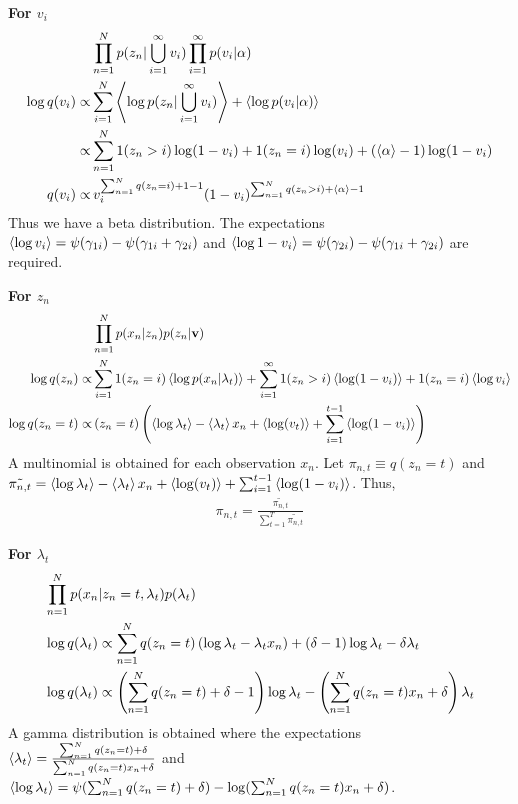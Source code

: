 \documentclass{article}
\begin{document}
\textbf{For $v_i $}
\begin{align}
\nonumber& \prod_{n=1}^{N}p(z_n|\bigcup_{i=1}^{\infty}v_i)\prod_{i=1}^{\infty}p(v_i|\alpha)\\
\nonumber \log q(v_i)\propto & \sum_{i=1}^{N} \left\langle\log p(z_n|\bigcup_{i=1}^{\infty}v_i)\right\rangle+\left\langle\log p(v_i|\alpha)\right\rangle\\
\nonumber \propto&\sum_{n=1}^{N}1(z_n>i)\log(1-v_i)+1(z_n=i)\log(v_i)+(\left\langle\alpha\right\rangle-1)\log (1-v_i)\\
q(v_i) \propto & \,v_i^{\sum_{n=1}^{N} q(z_n=i)+1-1}(1-v_i)^{\sum_{n=1}^{N} q(z_n>i)+\left\langle\alpha\right\rangle-1}
\end{align}
Thus we have a beta distribution. The expectations $\left\langle\log v_i\right\rangle=\psi(\gamma_{1i})-\psi(\gamma_{1i}+\gamma_{2i})$ and $\left\langle\log 1-v_i\right\rangle=\psi(\gamma_{2i})-\psi(\gamma_{1i}+\gamma_{2i})$ are required.

\textbf{For $z_n$}
\begin{align}
\nonumber&\prod_{n=1}^{N} p(x_n|z_n)p(z_n|\mathbf{v})\\
\nonumber\log q(z_n)\propto &\sum_{i=1}^{N} 1(z_n=i)\left\langle\log p(x_n|\lambda_t)\right\rangle+\sum_{i=1}^{\infty} 1(z_n>i)\left\langle\log(1-v_i)\right\rangle+1(z_n=i)\left\langle\log v_i\right\rangle\\
\log q(z_n=t)\propto &\left(z_n=t\right)\left(\left\langle\log \lambda_t\right\rangle-\left\langle\lambda_t\right\rangle x_n+\left\langle\log(v_t)\right\rangle+\sum_{i=1}^{t-1}\left\langle\log(1-v_i)\right\rangle\right)
\end{align}
A multinomial is obtained for each observation $x_n$. Let $\pi_{n,t}\equiv q(z_n=t)$ and $\tilde{\pi_{n,t}}=\left\langle\log \lambda_t\right\rangle-\left\langle\lambda_t\right\rangle x_n+\left\langle\log(v_t)\right\rangle+\sum_{i=1}^{t-1}\left\langle\log(1-v_i)\right\rangle$. Thus,
\begin{align}
\pi_{n,t}=\frac{\tilde{\pi_{n,t}}}{\sum_{t=1}^{T}\tilde{\pi_{n,t}}}
\end{align}

\textbf{For $\lambda_t$}
\begin{align}
\nonumber & \prod_{n=1}^{N}p(x_n|z_n=t,\lambda_t) p(\lambda_t)\\
\nonumber & \log q(\lambda_t) \propto \sum_{n=1}^{N}q(z_n=t)\left(\log\lambda_t-\lambda_t x_n\right)+(\delta-1)\log\lambda_t-\delta\lambda_t\\
& \log q(\lambda_t) \propto \left(\sum_{n=1}^{N} q(z_n=t) +\delta -1\right)\log\lambda_t-\left(\sum_{n=1}^{N} q(z_n=t)x_n+\delta\right)\lambda_t
\end{align}
A gamma distribution is obtained where the expectations $\left\langle\lambda_t\right\rangle=\frac{\sum_{n=1}^{N} q(z_n=t) +\delta}{\sum_{n=1}^{N} q(z_n=t)x_n+\delta}$ and $\left\langle\log\lambda_t\right\rangle=\psi(\sum_{n=1}^{N} q(z_n=t) +\delta)-\log(\sum_{n=1}^{N} q(z_n=t)x_n+\delta)$.
\end{document}
